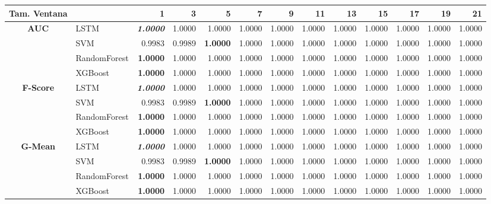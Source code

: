 \begin{table}[H]
	\centering
	\begin{adjustbox}{max width=14cm}
		\begin{tabular}{|c|l|r|r|r|r|r|r|r|r|r|r|r|}
			\hline
			\textbf{Tam. Ventana}&         &      1  &      3  &   5  &   7  &   9  &   11 &   13 &   15 &   17 &   19 &   21 \\
			\hline
			\textbf{AUC} &  LSTM & \textit{ \textbf{  1.0000 } } &  1.0000 &  1.0000 &  1.0000 &  1.0000 &  1.0000 &  1.0000 &  1.0000 &  1.0000 &  1.0000 &  1.0000 \\
			&  SVM &  0.9983 &  0.9989 & \textbf{  1.0000 } &  1.0000 &  1.0000 &  1.0000 &  1.0000 &  1.0000 &  1.0000 &  1.0000 &  1.0000 \\
			&  RandomForest & \textbf{  1.0000 } &  1.0000 &  1.0000 &  1.0000 &  1.0000 &  1.0000 &  1.0000 &  1.0000 &  1.0000 &  1.0000 &  1.0000 \\
			&  XGBoost & \textbf{  1.0000 } &  1.0000 &  1.0000 &  1.0000 &  1.0000 &  1.0000 &  1.0000 &  1.0000 &  1.0000 &  1.0000 &  1.0000 \\
			\hline
			\textbf{F-Score} &  LSTM & \textit{ \textbf{  1.0000 } } &  1.0000 &  1.0000 &  1.0000 &  1.0000 &  1.0000 &  1.0000 &  1.0000 &  1.0000 &  1.0000 &  1.0000 \\
			&  SVM &  0.9983 &  0.9989 & \textbf{  1.0000 } &  1.0000 &  1.0000 &  1.0000 &  1.0000 &  1.0000 &  1.0000 &  1.0000 &  1.0000 \\
			&  RandomForest & \textbf{  1.0000 } &  1.0000 &  1.0000 &  1.0000 &  1.0000 &  1.0000 &  1.0000 &  1.0000 &  1.0000 &  1.0000 &  1.0000 \\
			&  XGBoost & \textbf{  1.0000 } &  1.0000 &  1.0000 &  1.0000 &  1.0000 &  1.0000 &  1.0000 &  1.0000 &  1.0000 &  1.0000 &  1.0000 \\
			\hline
			\textbf{G-Mean} &  LSTM & \textit{ \textbf{  1.0000 } } &  1.0000 &  1.0000 &  1.0000 &  1.0000 &  1.0000 &  1.0000 &  1.0000 &  1.0000 &  1.0000 &  1.0000 \\
			&  SVM &  0.9983 &  0.9989 & \textbf{  1.0000 } &  1.0000 &  1.0000 &  1.0000 &  1.0000 &  1.0000 &  1.0000 &  1.0000 &  1.0000 \\
			&  RandomForest & \textbf{  1.0000 } &  1.0000 &  1.0000 &  1.0000 &  1.0000 &  1.0000 &  1.0000 &  1.0000 &  1.0000 &  1.0000 &  1.0000 \\
			&  XGBoost & \textbf{  1.0000 } &  1.0000 &  1.0000 &  1.0000 &  1.0000 &  1.0000 &  1.0000 &  1.0000 &  1.0000 &  1.0000 &  1.0000 \\

\end{tabular}
\end{adjustbox}
\end{table}
